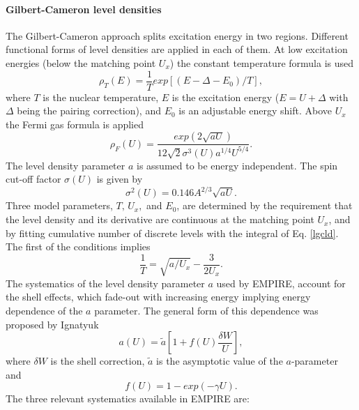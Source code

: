 \documentclass[twocolumn,amsmath,amssymb,10pt,groupedaddress,a4paper]{revtex4}
\begin{document}
\paragraph{Gilbert-Cameron level densities}
The Gilbert-Cameron approach \cite{gc} splits excitation energy in
two regions. Different functional forms of level densities
are applied in each of them. At low excitation energies (below the
matching point $U_{x}$) the constant temperature formula is used
\begin{equation}
\rho_{T}(E)=\frac{1}{T}exp\left[(E-\Delta-E_{0})/T\right],
\label{lgcld}
\end{equation}
\noindent where $T$ is the nuclear temperature, $E$ is the excitation energy
($E=U+\Delta$ with $\Delta$ being the pairing correction), and $E_{0}$
is an adjustable energy shift. Above $U_{x}$ the Fermi gas formula
is applied
\begin{equation}
\rho_{F}(U)=\frac{exp(2\sqrt{aU})}{12\sqrt{2}\sigma^3(U)a^{1/4}U^{5/4}}.
\label{ferld}
\end{equation}
The level density parameter $a$ is assumed to be energy independent.
The spin cut-off factor $\sigma(U)$ is given by
\begin{equation}
\sigma^{2}(U)=0.146A^{2/3}\sqrt{aU}.
\label{sigld}
\end{equation}
Three model parameters, $T,\, U_{x},$ and $E_{0}$, are determined
by the requirement that the level density and its derivative are continuous
at the matching point $U_{x}$, and by fitting cumulative number of
discrete levels with the integral of Eq. \ref{lgcld}. The first of
the conditions implies
\begin{equation}
\frac{1}{T}=\sqrt{a/U_{x}}-\frac{3}{2U_{x}}.
\label{condUT}
\end{equation}
The systematics of the level density parameter $a$ used by EMPIRE,
account for the shell effects, which fade-out
with increasing energy implying energy dependence of the $a$ parameter.
The general form of this dependence was proposed by Ignatyuk~\cite{ignaa}
\begin{equation}
a(U)=\widetilde{a}[1+f(U)\frac{\delta W}{U}],
\label{apiccoloGC}
\end{equation}
\noindent where $\delta W$ is the shell correction, $\widetilde{a}$ is the
asymptotic value of the $a$-parameter and
\begin{equation}
f(U)=1-exp(-\gamma U).
\label{shellGC}
\end{equation}
The three relevant systematics available in EMPIRE are:
\end{document}
